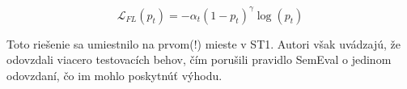 \begin{equation}
  \mathcal{L}_{FL}(p_t) = -\alpha_t (1 - p_t)^{\gamma} \log(p_t)
  \label{eq:focal_loss}
\end{equation}

Toto riešenie sa umiestnilo na prvom(!) mieste v ST1. Autori však uvádzajú, že odovzdali viacero testovacích behov, čím porušili pravidlo SemEval o jedinom odovzdaní, čo im mohlo poskytnúť výhodu.


